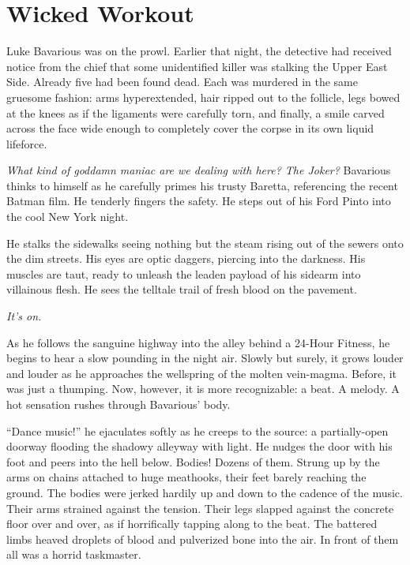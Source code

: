 \chapter{Wicked Workout}



Luke Bavarious was on the prowl. Earlier that night, the detective
had received notice from the chief that some unidentified killer
was stalking the Upper East Side. Already five had been found dead.
Each was murdered in the same gruesome fashion: arms hyperextended,
hair ripped out to the follicle, legs bowed at the knees as if the
ligaments were carefully torn, and finally, a smile carved across
the face wide enough to completely cover the corpse in its own
liquid lifeforce.



{\em What kind of goddamn maniac are we dealing with here? The
Joker?} Bavarious thinks to himself as he carefully primes his
trusty Baretta, referencing the recent Batman film. He tenderly
fingers the safety. He steps out of his Ford Pinto into the cool
New York night.



He stalks the sidewalks seeing nothing but the steam rising out of
the sewers onto the dim streets. His eyes are optic daggers,
piercing into the darkness. His muscles are taut, ready to unleash
the leaden payload of his sidearm into villainous flesh. He sees
the telltale trail of fresh blood on the pavement.



{\em It's on.}



As he follows the sanguine highway into the alley behind a 24-Hour
Fitness, he begins to hear a slow pounding in the night air. Slowly
but surely, it grows louder and louder as he approaches the
wellspring of the molten vein-magma. Before, it was just a
thumping. Now, however, it is more recognizable: a beat. A melody.
A hot sensation rushes through Bavarious' body.



``Dance music!'' he ejaculates softly as he creeps to the
source: a partially-open doorway flooding the shadowy alleyway with
light. He nudges the door with his foot and peers into the hell
below. Bodies! Dozens of them. Strung up by the arms on chains
attached to huge meathooks, their feet barely reaching the ground.
The bodies were jerked hardily up and down to the cadence of the
music. Their arms strained against the tension. Their legs slapped
against the concrete floor over and over, as if horrifically
tapping along to the beat. The battered limbs heaved droplets of
blood and pulverized bone into the air. In front of them all was a
horrid taskmaster.



